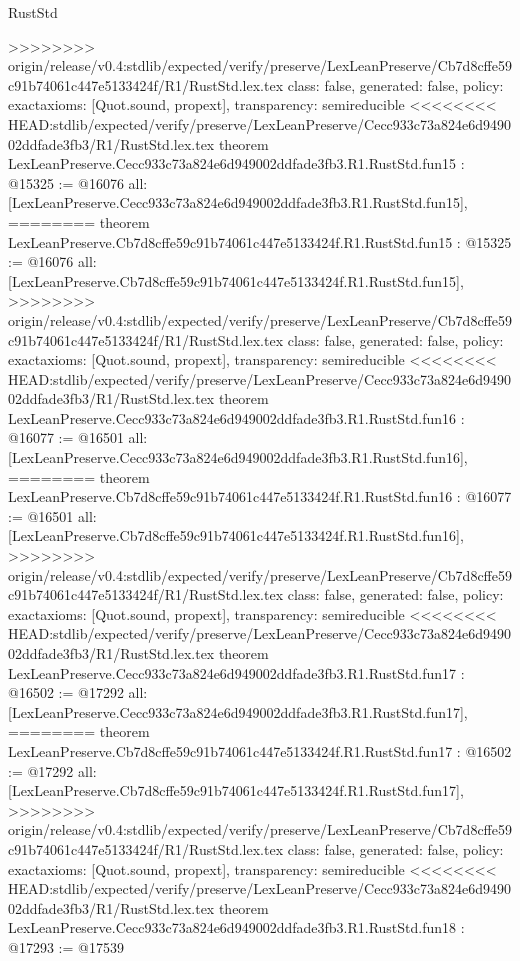 \begin{lexlean}{RustStd}
\begin{coremodule}
{\begin{coremodule}
{{{{{{{{{{{{{{{{{{>>>>>>>> origin/release/v0.4:stdlib/expected/verify/preserve/LexLeanPreserve/Cb7d8cffe59c91b74061c447e5133424f/R1/RustStd.lex.tex
  class: false,
  generated: false,
  policy: exact{axioms: [Quot.sound, propext]},
  transparency: semireducible
}
<<<<<<<< HEAD:stdlib/expected/verify/preserve/LexLeanPreserve/Cecc933c73a824e6d949002ddfade3fb3/R1/RustStd.lex.tex
theorem LexLeanPreserve.Cecc933c73a824e6d949002ddfade3fb3.R1.RustStd.fun15 : @15325 := @16076 {
  all: [LexLeanPreserve.Cecc933c73a824e6d949002ddfade3fb3.R1.RustStd.fun15],
========
theorem LexLeanPreserve.Cb7d8cffe59c91b74061c447e5133424f.R1.RustStd.fun15 : @15325 := @16076 {
  all: [LexLeanPreserve.Cb7d8cffe59c91b74061c447e5133424f.R1.RustStd.fun15],
>>>>>>>> origin/release/v0.4:stdlib/expected/verify/preserve/LexLeanPreserve/Cb7d8cffe59c91b74061c447e5133424f/R1/RustStd.lex.tex
  class: false,
  generated: false,
  policy: exact{axioms: [Quot.sound, propext]},
  transparency: semireducible
}
<<<<<<<< HEAD:stdlib/expected/verify/preserve/LexLeanPreserve/Cecc933c73a824e6d949002ddfade3fb3/R1/RustStd.lex.tex
theorem LexLeanPreserve.Cecc933c73a824e6d949002ddfade3fb3.R1.RustStd.fun16 : @16077 := @16501 {
  all: [LexLeanPreserve.Cecc933c73a824e6d949002ddfade3fb3.R1.RustStd.fun16],
========
theorem LexLeanPreserve.Cb7d8cffe59c91b74061c447e5133424f.R1.RustStd.fun16 : @16077 := @16501 {
  all: [LexLeanPreserve.Cb7d8cffe59c91b74061c447e5133424f.R1.RustStd.fun16],
>>>>>>>> origin/release/v0.4:stdlib/expected/verify/preserve/LexLeanPreserve/Cb7d8cffe59c91b74061c447e5133424f/R1/RustStd.lex.tex
  class: false,
  generated: false,
  policy: exact{axioms: [Quot.sound, propext]},
  transparency: semireducible
}
<<<<<<<< HEAD:stdlib/expected/verify/preserve/LexLeanPreserve/Cecc933c73a824e6d949002ddfade3fb3/R1/RustStd.lex.tex
theorem LexLeanPreserve.Cecc933c73a824e6d949002ddfade3fb3.R1.RustStd.fun17 : @16502 := @17292 {
  all: [LexLeanPreserve.Cecc933c73a824e6d949002ddfade3fb3.R1.RustStd.fun17],
========
theorem LexLeanPreserve.Cb7d8cffe59c91b74061c447e5133424f.R1.RustStd.fun17 : @16502 := @17292 {
  all: [LexLeanPreserve.Cb7d8cffe59c91b74061c447e5133424f.R1.RustStd.fun17],
>>>>>>>> origin/release/v0.4:stdlib/expected/verify/preserve/LexLeanPreserve/Cb7d8cffe59c91b74061c447e5133424f/R1/RustStd.lex.tex
  class: false,
  generated: false,
  policy: exact{axioms: [Quot.sound, propext]},
  transparency: semireducible
}
<<<<<<<< HEAD:stdlib/expected/verify/preserve/LexLeanPreserve/Cecc933c73a824e6d949002ddfade3fb3/R1/RustStd.lex.tex
theorem LexLeanPreserve.Cecc933c73a824e6d949002ddfade3fb3.R1.RustStd.fun18 : @17293 := @17539 {
}}}}}}}}}}}}}}}}}}}}}
\end{coremodule}}
\end{coremodule}
\end{lexlean}
